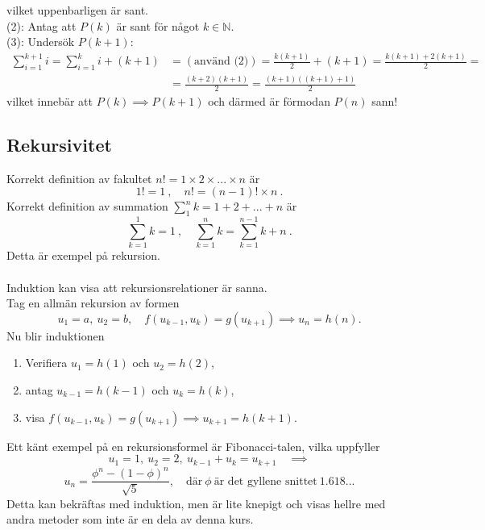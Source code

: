 \documentclass{article}
\begin{document}
vilket uppenbarligen är sant.
\\
(2): Antag att $P(k)$ är sant för något $k\in\mathbb{N}$.
\\
(3): Undersök $P(k+1)$:
\begin{equation*}
    \begin{split}
        \sum_{i=1}^{k+1}i=\sum_{i=1}^ki+(k+1) &= (\textrm{använd (2)})= \frac{k(k+1)}{2}+(k+1)=\frac{k(k+1)+2(k+1)}{2}=
        \\
        &=\frac{(k+2)(k+1)}{2}=\frac{(k+1)((k+1)+1)}{2}
    \end{split}
\end{equation*}
vilket innebär att $P(k)\implies P(k+1)$ och därmed är förmodan $P(n)$ sann!
\subsection{Rekursivitet}
Korrekt definition av fakultet $n!=1\times2\times ... \times n$ är
$$
1!=1 \ , \quad n!=(n-1)!\times n \ .
$$
Korrekt definition av summation $\sum_1^n k=1+2+...+n$ är 
$$
\sum_{k=1}^1k=1 \ , \quad \sum_{k=1}^nk=\sum_{k=1}^{n-1}k+n \ .
$$
Detta är exempel på rekursion.\\ \\
Induktion kan visa att rekursionsrelationer är sanna.\\ 
Tag en allmän rekursion av formen
$$
u_1=a, \ u_2=b, \quad f(u_{k-1},u_k)=g(u_{k+1}) \implies u_n=h(n).
$$ 
Nu blir induktionen
\begin{enumerate}%
    \item Verifiera $u_1=h(1)$ och $u_2=h(2)$,
    \item antag $u_{k-1}=h(k-1)$ och $u_k=h(k)$,
    \item visa $f(u_{k-1},u_k)=g(u_{k+1})\implies u_{k+1}=h(k+1)$.
\end{enumerate} 
\vspace{0.5 cm}
Ett känt exempel på en rekursionsformel är Fibonacci-talen, vilka uppfyller 
$$u_1=1, \ u_2=2, \ u_{k-1}+u_k=u_{k+1} \quad \implies $$
$$ u_n=\frac{\phi^n-(1-\phi)^n}{\sqrt{5}}, \quad \textrm{där}  \ \phi \ \textrm{är det gyllene snittet} \ 1.618... $$
Detta kan bekräftas med induktion, men är lite knepigt och visas hellre med andra metoder som inte är en dela av denna kurs.
\end{document}
